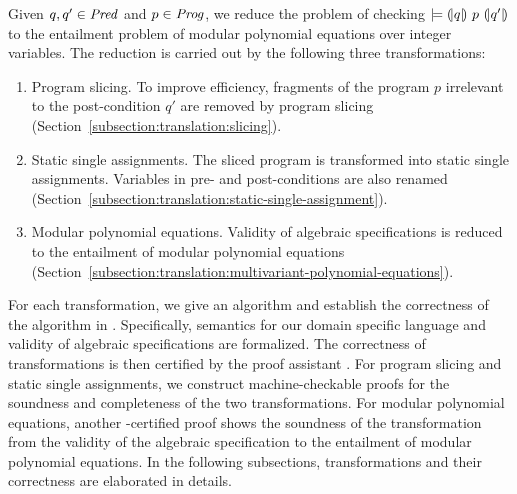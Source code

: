 
Given $q, q' \in \mathit{Pred}$ and $p \in \mathit{Prog}$, we reduce the problem of checking
$\models {(\!|}{q}{|\!)}~{p}~{(\!|}{q'}{|\!)}$ to the entailment problem of modular
polynomial equations over integer variables. The reduction is carried out by
the following three transformations:
\begin{enumerate}
\item Program slicing. To improve efficiency, fragments of the program $p$
  irrelevant to the post-condition $q'$ are removed by program slicing 
  (Section~\ref{subsection:translation:slicing}). 
\item Static single assignments. The sliced program is transformed
  into static single assignments. Variables in pre- and
  post-conditions are also renamed
  (Section~\ref{subsection:translation:static-single-assignment}).
\item Modular polynomial equations. Validity of algebraic specifications
  is reduced to the entailment of modular polynomial equations
  (Section~\ref{subsection:translation:multivariant-polynomial-equations}). 
\end{enumerate}

For each transformation, we give an algorithm and establish the
correctness of the algorithm in \coq. Specifically, semantics
for our domain specific language and validity of algebraic
specifications are formalized. The correctness of
transformations is then certified by the proof assistant \coq.
For program slicing and static single assignments, we
construct machine-checkable proofs for the soundness and completeness
of the two transformations. For modular polynomial equations, another
\coq-certified proof shows the soundness of the transformation
from the validity of the algebraic specification to the entailment of 
modular polynomial equations. In the following subsections,
transformations and their correctness are elaborated in details.  